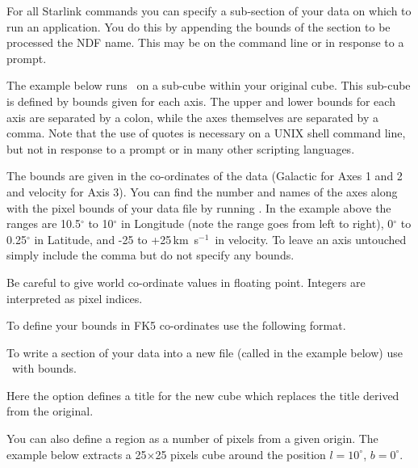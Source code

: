 \documentclass[11pt,oneside,chapters]{starlink}
\newcommand{\kms}{\mbox{$\,$km~s$^{-1}$}}   %
\newcommand{\kms}{\,km~s$^{-1}$}   %
\begin{document}
For all Starlink commands you can specify a sub-section of your data
on which to run an application. You do this by appending the bounds of
the section to be processed the NDF name. This may be on the command
line or in response to a prompt.

The example below runs \stats\ on a sub-cube within your original
cube. This sub-cube is defined by bounds given for each axis. The
upper and lower bounds for each axis are separated by a colon, while
the axes themselves are separated by a comma. Note that the use of
quotes is necessary on a UNIX shell command line, but not in response
to a prompt or in many other scripting languages.

\begin{terminalv}
\end{terminalv}
The bounds are given in the co-ordinates of the data (Galactic for Axes
1 and 2 and velocity for Axis 3). You can find the number and names of
the axes along with the pixel bounds of your data file by running
\ndftrace. In the example above the ranges are 10.5$^\circ$ to
10$^\circ$ in Longitude (note the range goes from left to right),
0$^\circ$ to 0.25$^\circ$ in Latitude, and -25 to +25\kms\ in
velocity. To leave an axis untouched simply include the comma but do
not specify any bounds.


\begin{tip}
Be careful to give world co-ordinate values in floating point.
Integers are interpreted as pixel indices.
\end{tip}

To define your bounds in FK5 co-ordinates use the following format.
\begin{terminalv}
\end{terminalv}

To write a section of your data into a new file (called
 in the example below) use \ndfcopy\ with bounds.
\begin{terminalv}
\end{terminalv}
Here the option  defines a title for the new cube which
replaces the title derived from the original.

You can also define a region as a number of pixels from a given
origin. The example below extracts a 25$\times$25 pixels cube around
the position $l=10^\circ$, $b=0^\circ$.
\begin{terminalv}
\end{terminalv}
\end{document}
